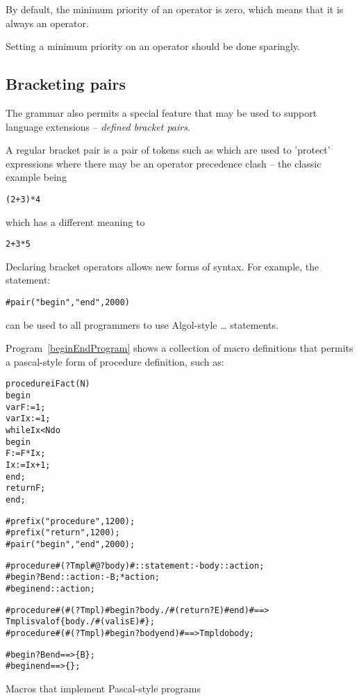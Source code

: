 By default, the minimum priority of an operator is zero, which means that it is always an operator.

\begin{aside}
Setting a minimum priority on an operator should be done sparingly.
\end{aside}

\subsection{Bracketing pairs}
The \Sr grammar also permits a special feature that may be used to support language extensions -- \emph{defined bracket pairs}.

A regular bracket pair is a pair of tokens such as \q{()} which are used to 'protect' expressions where there may be an operator precedence clash -- the classic example being 
\begin{alltt}
(2+3)*4
\end{alltt}
which has a different meaning to
\begin{alltt}
2+3*5
\end{alltt}

Declaring bracket operators allows new forms of syntax. For example, the statement:
\begin{alltt}
\#pair("begin","end",2000)
\end{alltt}
can be used to all programmers to use Algol-style \ldots{} statements. 

Program~\vref{beginEndProgram} shows a collection of macro definitions
that permits a pascal-style form of procedure definition, such as:
\begin{alltt}
procedure iFact(N)
begin
  var F := 1;
  var Ix := 1;
  while Ix < N do 
  begin
    F := F*Ix;
    Ix := Ix+1;
  end;
  return F;
end;
\end{alltt}

\begin{program}
\begin{alltt}
\#prefix("procedure",1200);
\#prefix("return",1200);
\#pair("begin","end",2000);
  
\#procedure #(?Tmpl #@ ?body)# :: statement :- body::action;
\#begin ?B end :: action :- B;*action;
\#begin end :: action;
  
\#procedure #( #(?Tmpl)# begin ?body./#(return ?E)# end )#==> 
   Tmpl is valof \{body./#(valis E)# \}; 
\#procedure #( #(?Tmpl)# begin ?body end)# ==> Tmpl do body ; 

\#begin ?B end ==> \{B\};
\#begin end ==> \{\};
\end{alltt}
\caption{Macros that implement Pascal-style programs\label{beginEndProgram}}
\end{program}

